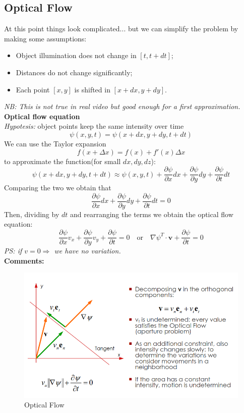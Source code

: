 \subsection{Optical Flow}
At this point things look complicated... but we can simplify the problem by making some assumptions:
\begin{itemize}
    \item Object illumination does not change in $[t, t + dt]$;
    \item Distances do not change significantly;
    \item Each point $[x,y]$ is shifted in $[x + dx, y + dy]$.
\end{itemize}
\textit{NB: This is not true in real video but good enough for a first approximation.}
\\\textbf{Optical flow equation}
\\\textit{Hypotesis:} object points keep the same intensity over time\\
\[
    \psi(x,y,t) = \psi(x + dx, y + dy, t + dt)
\]
We can use the Taylor expansion\[f(x + \Delta x) =f(x)+f'(x)\Delta x\] to approximate the function(for small $dx, dy, dz$):
\[
    \psi(x + dx, y + dy, t + dt) \approx \psi(x,y,t) + \frac{\partial \psi}{\partial x}dx + \frac{\partial \psi}{\partial y}dy + \frac{\partial \psi}{\partial t}dt
\]
Comparing the two we obtain that 
\[
    \frac{\partial \psi}{\partial x}dx + \frac{\partial \psi}{\partial y}dy + \frac{\partial \psi}{\partial t}dt = 0
\]
Then, dividing by $dt$ and rearranging the terms we obtain the optical flow equation:
\[
    \frac{\partial \psi}{\partial x}v_x + \frac{\partial \psi}{\partial y}v_y + \frac{\partial \psi}{\partial t} = 0 \quad \text{or} \quad \nabla \psi ^{T} \cdot \mathbf{v} + \frac{\partial \psi}{\partial t} = 0
\]
\textit{PS: if $v=0 \Rightarrow$ we have no variation.}
\\\textbf{Comments:}
\begin{figure}[h]
    \centering
    \includegraphics[width=1\textwidth]{Figures/OpticalFlow.png}
    \caption{Optical Flow}
\end{figure}
